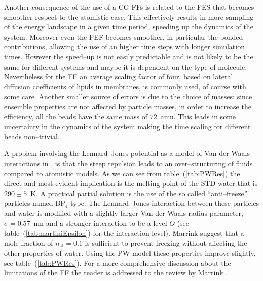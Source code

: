 Another consequence of the use of a \ac{CG} \acp{FF} is related to the \ac{FES} that becomes smoother respect to
the atomistic case. This effectively results in more sampling of the energy landscape in a given time period,
speeding up the dynamics of the system. Moreover even the \ac{PEF} becomes smoother, in particular the bonded
contributions, allowing the use of an higher time steps with longer simulation times. However the speed--up is
not easily predictable and is not likely to be the same for different systems and maybe it is dependent on the
type of molecule. Nevertheless for the \martini \ac{FF} an average scaling factor of four, based on lateral
diffusion coefficients of lipids in membranes, is commonly used, of course with some care. Another smaller source
of errors is due to the choice of masses: since ensemble properties are not affected by particle masses, in order
to increase the efficiency, all the \martini beads have the same mass of $72$~amu. This leads in some uncertainty
in the dynamics of the system making the time scaling for different beads non--trivial.

A problem involving the Lennard--Jones potential as a model of Van der Waals interactions in \martini, is that
the steep repulsion leads to an over--structuring of fluids compared to atomistic models. As we can see from
table~(\ref{tab:PWRes}) the direct and most evident implication is the melting point of the \acs{STD} \martini
water that is $290 \pm 5$~K. A practical partial solution is the use of the so called ``anti--freeze'' particles
named BP$_4$ type. The Lennard--Jones interaction between these particles and water is modified with a slightly
larger Van der Waals radius parameter, $\sigma = 0.57$~nm and a stronger interaction to be a level $O$ (see
table~(\ref{tab:martiniEpsilon}) for the interaction level). Marrink \etal suggest that a mole fraction of
$n_{\text{af}} = 0.1$ is sufficient to prevent freezing without affecting the other properties of water.
Using the \ac{PW} model these properties improve slightly, see table~(\ref{tab:PWRes}). For a more comprehensive
discussion about the limitations of the \martini \ac{FF} the reader is addressed to the review by Marrink \etal 
\cite{MartiniReview}.

